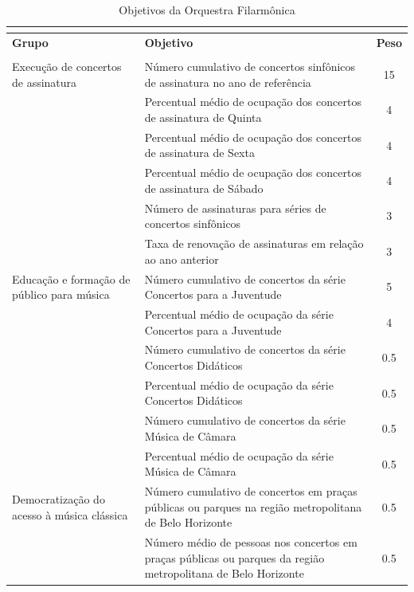 \documentclass[a4paper, 12pt, openright, oneside, german, french, english, brazil]{abntex2}
\begin{document}
\begin{SingleSpace}
	\begin{footnotesize}
		\begin{center}
			\begin{longtable}{p{6cm} p{7cm} c}
				\caption{Objetivos da Orquestra Filarmônica}\\
				\label{goals}\\
				\hline
				\textbf{Grupo}  & \textbf{Objetivo} & \textbf{Peso} \\
				\hline
				\endfirsthead
				\hline
				\endhead
				\hline
				\endfoot
				\hline
				\multicolumn{3}{l}{Fonte: \cite[p. 3-4]{filarmonica2017gerencial}}\\
				\endlastfoot

				Execução de concertos de assinatura & Número cumulativo de concertos sinfônicos de assinatura no ano de referência & 15 \\
				& Percentual médio de ocupação dos concertos de assinatura de Quinta & 4 \\
				& Percentual médio de ocupação dos concertos de assinatura de Sexta & 4 \\
				& Percentual médio de ocupação dos concertos de assinatura de Sábado & 4 \\
				& Número de assinaturas para séries de concertos sinfônicos & 3 \\
				& Taxa de renovação de assinaturas em relação ao ano anterior & 3 \\
				\hline
				Educação e formação de público para música & Número cumulativo de concertos da série Concertos para a Juventude & 5 \\
				& Percentual médio de ocupação da série Concertos para a Juventude & 4 \\
				& Número cumulativo de concertos da série Concertos Didáticos & 0.5 \\
				& Percentual médio de ocupação da série Concertos Didáticos & 0.5 \\
				& Número cumulativo de concertos da série Música de Câmara & 0.5 \\
				& Percentual médio de ocupação da série Música de Câmara & 0.5 \\
				\hline
				Democratização do acesso à música clássica & Número cumulativo de concertos em praças públicas ou parques na região metropolitana de Belo Horizonte & 0.5 \\
				& Número médio de pessoas nos concertos em praças públicas ou parques da região metropolitana de Belo Horizonte & 0.5 \\

\end{longtable}
\end{center}
\end{footnotesize}
\end{SingleSpace}
\end{document}
